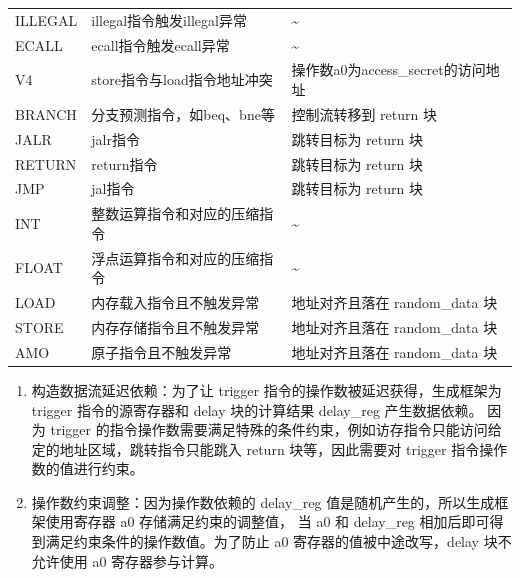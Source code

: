 \begin{table}[h!]
\begin{center}
{\begin{tabular}{|l|l|l|}
            ILLEGAL             &   illegal指令触发illegal异常                & \textasciitilde                                             \\
            ECALL               &   ecall指令触发ecall异常                    & \textasciitilde                                             \\
            V4                  &   store指令与load指令地址冲突                &  操作数a0为access\_secret的访问地址                      \\
            BRANCH              &   分支预测指令，如beq、bne等                 &  控制流转移到 return 块    \\
            JALR                &   jalr指令                                 &  跳转目标为 return 块                                        \\
            RETURN              &   return指令                               &  跳转目标为 return 块                                        \\
            JMP                 &   jal指令                                  &  跳转目标为 return 块                                        \\
            INT                 &   整数运算指令和对应的压缩指令      & \textasciitilde                                             \\
            FLOAT               &   浮点运算指令和对应的压缩指令    & \textasciitilde                                             \\
            LOAD                &   内存载入指令且不触发异常          & 地址对齐且落在 random\_data 块                 \\ 
            STORE               &   内存存储指令且不触发异常          & 地址对齐且落在 random\_data 块                    \\ 
            AMO                 &   原子指令且不触发异常                       & 地址对齐且落在 random\_data 块                    \\ 
            \hline
        \end{tabular}
    }
    \end{center}
\end{table}

\begin{enumerate}
    \item 构造数据流延迟依赖：为了让 trigger 指令的操作数被延迟获得，生成框架为 trigger 指令的源寄存器和 delay 块的计算结果 delay\_reg 产生数据依赖。
    因为 trigger 的指令操作数需要满足特殊的条件约束，例如访存指令只能访问给定的地址区域，跳转指令只能跳入 return 块等，因此需要对
    trigger 指令操作数的值进行约束。\par
    \item 操作数约束调整：因为操作数依赖的 delay\_reg 值是随机产生的，所以生成框架使用寄存器 a0 存储满足约束的调整值，
    当 a0 和 delay\_reg 相加后即可得到满足约束条件的操作数值。为了防止 a0 寄存器的值被中途改写，delay 块不允许使用 a0 寄存器参与计算。\par
\end{enumerate}

